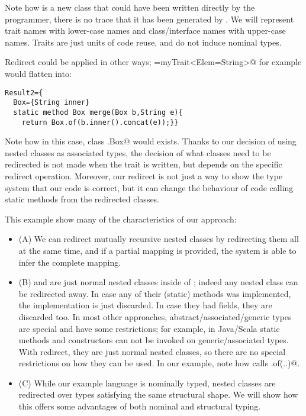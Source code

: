Note how  \Q@Result@ is a new class
that could have been written directly by the programmer,
there is no trace that it has been generated by \Q@myTrait@.
We will represent trait names with lower-case names and class/interface names with upper-case names.
Traits are just units of code reuse, and do not induce nominal types.

Redirect could be applied in other ways; =myTrait<Elem=String>@ 
for example would flatten into:
\begin{lstlisting}
Result2={
  Box={String inner}
  static method Box merge(Box b,String e){
    return Box.of(b.inner().concat(e));}}
\end{lstlisting}
Note how in this case, class \Q@Result.Box@ would exists. Thanks to our decision of using nested classes
as associated types, the decision of what classes need to be redirected is not made when the trait is written,
but depends on the specific redirect operation.
Moreover, our redirect is not just a way to show the type system that our code is correct, but it can change 
the behaviour of code calling static methods from the redirected classes.


This example show many of the characteristics of our approach:
\begin{itemize}
\item(A) We can redirect mutually recursive nested classes by redirecting them all at the same time, and
if a partial mapping is provided, the system is able to infer the complete mapping.

\item(B) \Q@Box@ and \Q@Elem@ are just normal nested classes inside of \Q@myTrait@; indeed
any nested class can be redirected away.
In case any of their (static) methods was implemented, the implementation is just discarded. In case they had fields, they are discarded too.
In most other approaches, abstract/associated/generic types are special and have some restrictions;
for example, in Java/Scala static methods and constructors can not be invoked on generic/associated types.
With redirect, they are just normal nested classes, so there are no special restrictions on how they can be used.
In our example, note how \Q@merge@ calls \Q@Box.of(..)@.

\item(C) 
While our example language is nominally typed, 
nested classes are redirected over types satisfying the same structural shape.
We will show how this offers some advantages of both nominal and structural typing.
\end{itemize}

